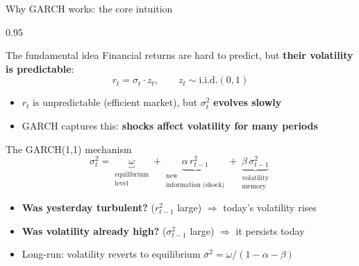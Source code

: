 \documentclass[9pt, aspectratio=169, t]{beamer}
\begin{document}
\begin{frame}{Why GARCH works: the core intuition}
    \begin{cminipage}{0.95\textwidth}
        \vspace{-0.3cm}
        {\scriptsize
        \begin{block}{The fundamental idea}
            Financial returns are hard to predict, but \textbf{their volatility is predictable}:
            \vspace{-3mm}
            \[
                r_t = \sigma_t \cdot z_t, \qquad z_t \sim \text{i.i.d.}(0,1)
            \]
            \vspace{-5mm}
            \begin{itemize}\setlength{\itemsep}{0pt}
                \item $r_t$ is unpredictable (efficient market), but $\sigma_t^2$ \textbf{evolves slowly}
                \item GARCH captures this: \textbf{shocks affect volatility for many periods}
            \end{itemize}
        \end{block}
        \vspace{-2mm}
        \begin{exampleblock}{The GARCH(1,1) mechanism}
            \vspace{-3mm}
            \[
                \sigma_t^2 = \underbrace{\omega}_{\substack{\text{equilibrium}\\\text{level}}} + \underbrace{\alpha\, r_{t-1}^2}_{\substack{\text{new}\\\text{information (shock)}}} + \underbrace{\beta\, \sigma_{t-1}^2}_{\substack{\text{volatility}\\\text{memory}}}
            \]
            \vspace{-4mm}
            \begin{itemize}\setlength{\itemsep}{0pt}
                \item \textbf{Was yesterday turbulent?} ($r_{t-1}^2$ large) $\Rightarrow$ today's volatility rises
                \item \textbf{Was volatility already high?} ($\sigma_{t-1}^2$ large) $\Rightarrow$ it persists today
                \item Long-run: volatility reverts to equilibrium $\bar{\sigma}^2 = \omega / (1 - \alpha - \beta)$
            \end{itemize}
        \end{exampleblock}
        \vspace{-2mm}
}
\end{cminipage}
\end{frame}
\end{document}

